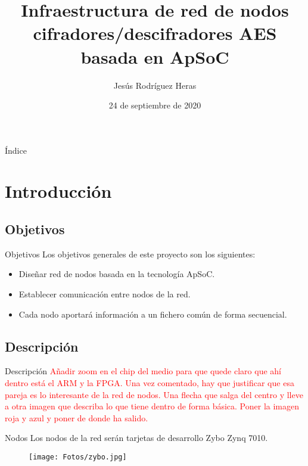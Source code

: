 \documentclass[aspectratio=169]{beamer}
\title{Infraestructura de red de nodos cifradores/descifradores AES basada en ApSoC}
\author{Jesús Rodríguez Heras}
\date{24 de septiembre de 2020}
\begin{document}
\begin{frame}
  \titlepage
  
\end{frame}

\begin{frame}{Índice}
\tableofcontents
\end{frame}

\section{Introducción}
\subsection{Objetivos}
\begin{frame}{Objetivos}
Los objetivos generales de este proyecto son los siguientes:
\begin{itemize}
	\item Diseñar red de nodos basada en la tecnología ApSoC.
	\item Establecer comunicación entre nodos de la red.
	\item Cada nodo aportará información a un fichero común de forma secuencial.
\end{itemize}
\end{frame}

\subsection{Descripción}
\begin{frame}{Descripción}
\textcolor{red}{Añadir zoom en el chip del medio para que quede claro que ahí dentro está el ARM y la FPGA. Una vez comentado, hay que justificar que esa pareja es lo interesante de la red de nodos. Una flecha que salga del centro y lleve a otra imagen que describa lo que tiene dentro de forma básica. Poner la imagen roja y azul y poner de donde ha salido.}
\begin{block}{Nodos}
	Los nodos de la red serán tarjetas de desarrollo Zybo Zynq 7010.
\end{block}
\begin{figure}[h]
	\centering
	\texttt{[image: Fotos/zybo.jpg]}
\end{figure}
\end{frame}
\end{document}
